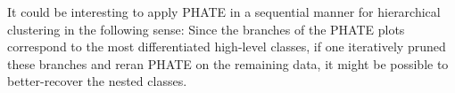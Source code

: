 It could be interesting to apply PHATE in a sequential manner for hierarchical clustering in the following sense: Since the branches of the PHATE plots correspond to the most differentiated high-level classes, if one iteratively pruned these branches and reran PHATE on the remaining data, it might be possible to better-recover the nested classes. 
